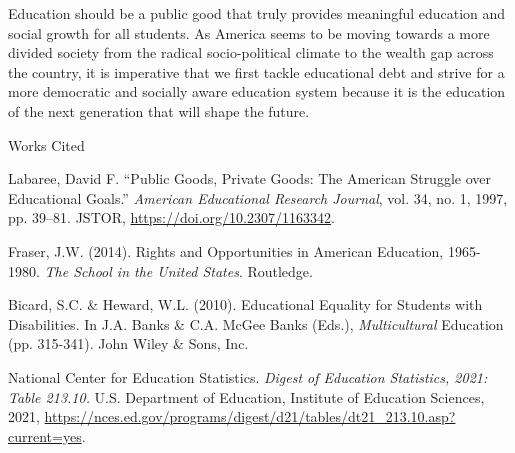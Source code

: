 \documentclass[12pt]{article}
\newcommand{\bibent}{\noindent \hangindent 40pt}
\newenvironment{workscited}{\newpage \begin{center} Works Cited \end{center}}{\newpage }
\begin{document}
\begin{flushleft}
Education should be a public good that truly provides meaningful education and social growth
for all students. As America seems to be moving towards a more divided society from the radical
socio-political climate to the wealth gap across the country, it is imperative that we first tackle
educational debt and strive for a more democratic and socially aware education system because it
is the education of the next generation that will shape the future. 














\begin{workscited}

\bibent
Labaree, David F.
``Public Goods, Private Goods: The American Struggle over Educational
Goals.'' \textit{American Educational Research Journal}, vol. 34, no. 1, 1997, pp. 39–81. JSTOR,
\href{https://doi.org/10.2307/1163342}{https://doi.org/10.2307/1163342}.

\bibent
Fraser, J.W. (2014). Rights and Opportunities in American Education, 1965-1980.
\textit{The School in the United States}. Routledge.

\bibent
Bicard, S.C. \& Heward, W.L. (2010). Educational Equality for Students with Disabilities.
In J.A. Banks \& C.A. McGee Banks (Eds.), \textit{Multicultural} Education (pp. 315-341).
John Wiley \& Sons, Inc.

\bibent
National Center for Education Statistics.
\textit{Digest of Education Statistics, 2021: Table 213.10.} U.S. Department of Education,
Institute of Education Sciences, 2021,
\href{https://nces.ed.gov/programs/digest/d21/tables/dt21_213.10.asp?current=yes}{https://nces.ed.gov/programs/digest/d21/tables/dt21\_213.10.asp?current=yes}.


\end{workscited}



\end{flushleft}
\end{document}
